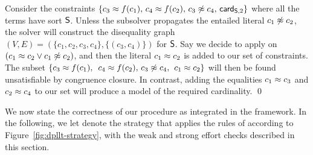 \documentclass{svjour3}                     %
\begin{document}
\begin{example}
Consider the constraints 
$\{c_3 \teq f(c_1),\, c_4 \teq f(c_2),\, c_3 \tneq c_4,\, \card[\So,2] \}$
where all the terms have sort $\So$.
Unless the \euf subsolver propagates the entailed literal $c_1 \tneq c_2$,
the \fcc solver will construct the disequality graph 
$(V, E) = (\{c_1, c_2, c_3, c_4 \}, \{(c_3, c_4)\})$ for $\So$.
Say we decide to apply  on $( c_1 \teq c_2 \vee c_1 \tneq c_2 )$,
and then the literal $c_1 \teq c_2$ is added to our set of constraints.
The subset
$\{c_3 \teq f(c_1),\,$ $c_4 \teq f(c_2),\, c_3 \tneq c_4,\,$ $c_1 \teq c_2\}$
will then be found unsatisfiable by congruence closure.
In contrast, adding the equalities $c_1 \teq c_3$ and $c_2 \teq c_4$ to our set will produce
a model of the required cardinality.
\qed
\end{example}

\begin{comment}
It is immediate that the solver in this section
described in this section is also sound.
To argue that it is terminating, notice that $|fix\_region|$ is terminating 
since each recursive call to this procedure
reduces the number of regions in $\mathcal{R}_D$ by one,
and similarly for repeated calls of the strong effort check.
Additionally, we have that all introduced literals
(either those when reporting clique lemmas at weak effort, or when splitting on equalities at strong effort)
are taken from the finite set of equalities and disequalities between terms occurring in our original clause set $F_0$.
Since the conditions for answering satisfiable are the same as those as mentioned in Lemma~\ref{lem:fcc-correct}
and the solver mentioned in this section is terminating, it is also complete.
\end{comment}

We now state the correctness of our \fcc procedure as integrated in the \dpllts framework.
In the following, we let \checkfcc denote the strategy 
that applies the rules of \dplltsfcconly 
according to Figure~\ref{fig:dpllt-strategy},
with the weak and strong effort checks described in this section.
\end{document}
